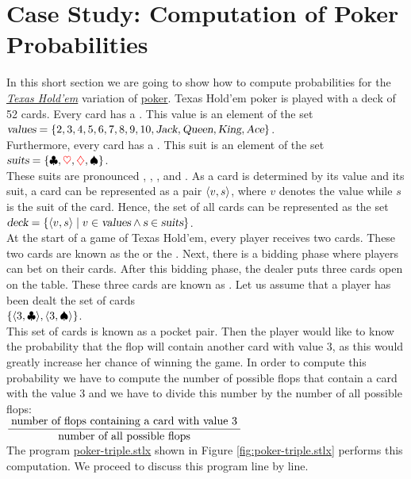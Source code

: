 \section{Case Study: Computation of Poker Probabilities}
In this short section we are going to show how to compute probabilities for the
\href{https://en.wikipedia.org/wiki/Texas_hold_%27em}{\textsl{Texas Hold'em}} variation of 
\href{https://en.wikipedia.org/wiki/Poker}{poker}.   Texas Hold'em poker is played with a deck of 52
cards.  Every card has a .  This value is an element of the set
\\[0.2cm]
\hspace*{1.3cm} 
$\textsl{values} = \{ 2, 3, 4, 5, 6, 7, 8, 9, 10, \textsl{Jack}, \textsl{Queen}, \textsl{King}, \textsl{Ace} \}$.
\\[0.2cm]
Furthermore, every card has a .  This suit is an element of the set
\\[0.2cm]
\hspace*{1.3cm} 
$\textsl{suits} = \{ \clubsuit , \mbox{$\color{red}{\ensuremath{\heartsuit }}$}, \mbox{$\color{red}{\diamondsuit}$}, \spadesuit  \}$.
\\[0.2cm]
These suits are pronounced , , , and .
As a card is determined by its value and its suit, a card can be represented as a pair $\pair(v,s)$, where $v$
denotes the value while $s$ is the suit of the card.  Hence, the set of all cards can be represented as the set
\\[0.2cm]
\hspace*{1.3cm} 
$\textsl{deck} = \{ \pair(v,s) \mid v \in \textsl{values} \wedge \textsl{s} \in \textsl{suits} \}$.
\\[0.2cm]
At the start of a game of Texas Hold'em, every player receives two cards.  These two cards are known
as the  or the .  Next, there is a bidding phase where players can bet on their
cards.   After this bidding phase, the dealer puts three cards open on the table.  These three cards are
known as .  Let us assume that a player has been dealt the set of cards
\\[0.2cm]
\hspace*{1.3cm}
$\{ \pair(3, \club), \pair(3, \spade) \}$.
\\[0.2cm]
This set of cards is known as a pocket pair.  Then the player would like to know the probability
that the flop will contain another card with value $3$, as this would greatly increase her chance of
winning the game.  In order to compute this probability we have to compute the number of possible
flops that contain a card with the value $3$ and we have to divide this number by the number of all
possible flops:
\\[0.2cm]
\hspace*{1.3cm}
$\displaystyle \frac{\;\mbox{number of flops containing a card with value $3$}\;}{\mbox{number of all possible flops}}$
\\[0.2cm]
The program
\href{https://github.com/karlstroetmann/Logik/blob/master/SetlX/poker-triple.stlx}{poker-triple.stlx}
shown in Figure \ref{fig:poker-triple.stlx} performs this computation.  We proceed to discuss this
program line by line.


